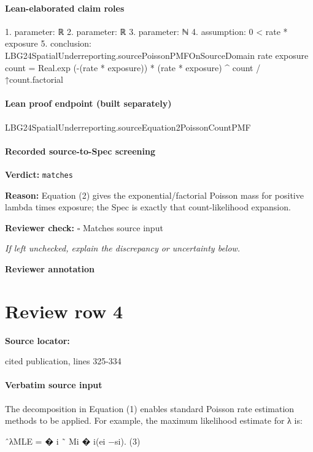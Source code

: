 \documentclass[10pt]{article}
\newcommand{\reviewerbox}{%
  \par\noindent\fbox{\parbox{0.96\linewidth}{\rule{0pt}{0.38in}}}\par
}
\newcommand{\reviewmatch}[1]{%
  \par\noindent\textbf{Reviewer check:} $\square$\; #1\par
  \noindent\emph{If left unchecked, explain the discrepancy or uncertainty below.}\par
}
\begin{document}
\paragraph{Lean-elaborated claim roles}\begin{ReviewVerbatim}
1. parameter: ℝ
2. parameter: ℝ
3. parameter: ℕ
4. assumption: 0 < rate * exposure
5. conclusion: LBG24SpatialUnderreporting.sourcePoissonPMFOnSourceDomain rate exposure count =
  Real.exp (-(rate * exposure)) * (rate * exposure) ^ count / ↑count.factorial
\end{ReviewVerbatim}

\paragraph{Lean proof endpoint (built separately)}\begin{ReviewVerbatim}
LBG24SpatialUnderreporting.sourceEquation2PoissonCountPMF
\end{ReviewVerbatim}

\paragraph{Recorded source-to-Spec screening}
\textbf{Verdict:} \texttt{matches}
\\
{\raggedright
\textbf{Reason:} Equation (2) gives the exponential/\allowbreak{}factorial Poisson mass for positive lambda times exposure;\allowbreak{} the Spec is exactly that count-\allowbreak{}likelihood expansion.\allowbreak{}
\par}
\reviewmatch{Matches source input}
\noindent\textbf{Reviewer annotation}\par
\reviewerbox
\clearpage
\hypertarget{source-claim-4e5d367d4931bb6a}{}
\section*{Review row 4}
\textbf{Source locator:} {\footnotesize\raggedright cited publication, lines 325-\allowbreak{}334\par}
\paragraph{Verbatim source input}
\begin{ReviewVerbatim}
The decomposition in Equation (1) enables standard Poisson rate estimation methods to be
applied. For example, the maximum likelihood estimate for λ is:

ˆλMLE =
�
i ˜
Mi
�
i(ei −si).
(3)
\end{ReviewVerbatim}
\end{document}
